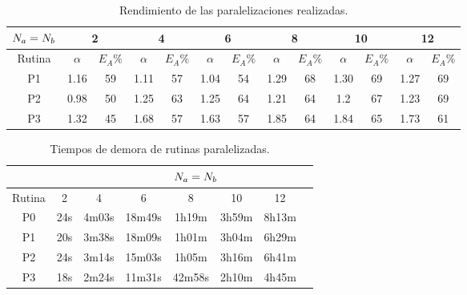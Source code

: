 \begin{table}[h]
 \centering
\begin{tabular}{|c|c|c|c|c|c|c|c|c|c|c|c|c|}
\hline $N_a=N_b$&\multicolumn{2}{|c|}{2}&\multicolumn{2}{|c|}{4}&\multicolumn{2}{|c|}{6}&\multicolumn{2}{|c|}{8}&\multicolumn{2}{|c|}{10}&\multicolumn{2}{|c|}{12}\\
\hline Rutina&$\alpha$&$E_A\%$&$\alpha$&$E_A\%$&$\alpha$&$E_A\%$&$\alpha$&$E_A\%$&$\alpha$&$E_A\%$&$\alpha$&$E_A\%$\\
\hline P1 & 1.16 &59 &1.11 &57 &1.04 & 54&1.29 &68 &1.30 &{\color{red}69} &1.27 &{\color{red}69} \\
\hline P2 & {\color{red}0.98} &50 &1.25 &63 &1.25 & 64&1.21 &64 &1.2 &67 &1.23 &{\color{red}69} \\
\hline P3 & 1.32 &45 &1.68 &57 &1.63 & 57&{\color{red}1.85} &64 &1.84 &65 &1.73 &61 \\
\hline
\end{tabular}\caption{Rendimiento de las paralelizaciones realizadas.}\label{tabla:rendimientos_paralelizaciones}
\end{table}
\begin{table}[h]
 \centering
\begin{tabular}{|c|c|c|c|c|c|c|c|}
\hline \multicolumn{2}{|c|}{} &\multicolumn{6}{|c|}{$N_a=N_b$}\\
\hline Rutina& 2&4&6&8&10&12\\
\hline P0 & 24s& 4m03s& 18m49s& 1h19m& 3h59m& 8h13m\\
\hline P1 & 20s& 3m38s& 18m09s& 1h01m& 3h04m& 6h29m\\
\hline P2 & 24s& 3m14s& 15m03s& 1h05m& 3h16m& 6h41m\\
\hline P3 & 18s& 2m24s& 11m31s& 42m58s& 2h10m& 4h45m\\
\hline
\end{tabular}\caption{Tiempos de demora de rutinas paralelizadas.}\label{tabla:tiempos_paralelizaciones}
\end{table}